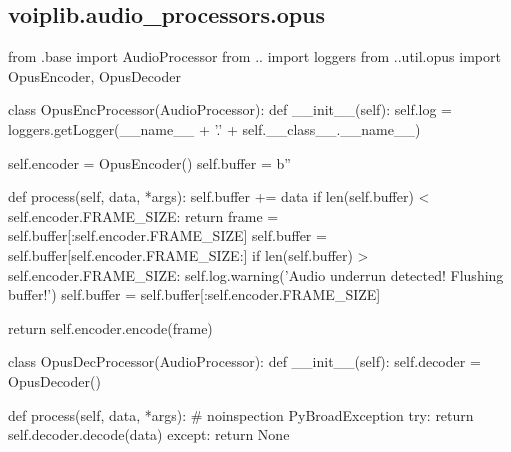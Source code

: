 \subsection{voiplib.audio\_processors.opus}
\begin{pythoncode}
from .base import AudioProcessor
from .. import loggers
from ..util.opus import OpusEncoder, OpusDecoder


class OpusEncProcessor(AudioProcessor):
    def __init__(self):
        self.log = loggers.getLogger(__name__ + '.' + self.__class__.__name__)

        self.encoder = OpusEncoder()
        self.buffer = b''

    def process(self, data, *args):
        self.buffer += data
        if len(self.buffer) < self.encoder.FRAME_SIZE:
            return
        frame = self.buffer[:self.encoder.FRAME_SIZE]
        self.buffer = self.buffer[self.encoder.FRAME_SIZE:]
        if len(self.buffer) > self.encoder.FRAME_SIZE:
            self.log.warning('Audio underrun detected! Flushing buffer!')
            self.buffer = self.buffer[:self.encoder.FRAME_SIZE]

        return self.encoder.encode(frame)


class OpusDecProcessor(AudioProcessor):
    def __init__(self):
        self.decoder = OpusDecoder()

    def process(self, data, *args):
        # noinspection PyBroadException
        try:
            return self.decoder.decode(data)
        except:
            return None
\end{pythoncode}
